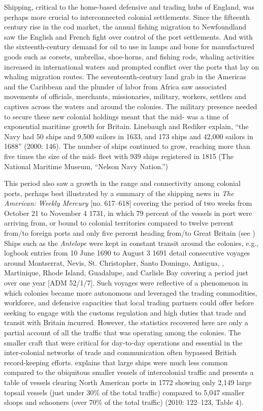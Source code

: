 Shipping, critical to the home-based defensive and trading hubs of England, was perhaps more crucial to interconnected colonial settlements. Since the fifteenth century rise in the cod market, the annual fishing migration to Newfoundland saw the English and French fight over control of the port settlements. And with the sixteenth-century demand for oil to use in lamps and bone for manufactured goods such as corsets, umbrellas, shoe-horns, and fishing rods, whaling activities increased in international waters and prompted conflict over the ports that lay on whaling migration routes. The seventeenth-century land grab in the Americas and the Caribbean and the plunder of labor from Africa saw associated movements of officials, merchants, missionaries, military, workers, settlers and captives across the waters and around the colonies. The military presence needed to secure these new colonial holdings meant that the mid- was a time of exponential maritime growth for Britain. Linebaugh and Rediker explain, “the Navy had 50 ships and 9,500 sailors in 1633, and 173 ships and 42,000 sailors in 1688” (2000: 146).  The number of ships continued to grow, reaching more than five times the size of the mid- fleet with 939 ships registered in 1815 (The National Maritime Museum, “Nelson Navy Nation.”) 

This period also saw a growth in the range and connectivity among colonial ports, perhaps best illustrated by a summary of the shipping news in \textit{The American: Weekly Mercury} [no. 617--618] covering the period of two weeks from October 21 to November 4 1731, in which 79 percent of the vessels in port were arriving from, or bound to colonial territories compared to twelve percent from/to foreign ports and only five percent heading from/to Great Britain (see ) Ships such as the \textit{Antelope} were kept in constant transit around the colonies, e.g., logbook entries from 10 June {1690} to August 3 1691 detail consecutive voyages around Montserrat, Nevis, St. Christopher, Santo Domingo, Antigua, , Martinique, Rhode Island, Guadalupe, and Carlisle Bay covering a period just over one year [ADM 52/1/7]. Such voyages were reflective of a phenomenon in which colonies became more autonomous and leveraged the trading commodities, workforce, and defensive capacities that local trading partners could offer before seeking to engage with the customs regulation and high duties that trade and transit with Britain incurred. However, the statistics recovered here are only a partial account of all the traffic that was operating among the colonies. The smaller craft that were critical for day-to-day operations and essential in the inter-colonial networks of trade and communication often bypassed British record-keeping efforts. \citeauthor{Jarvis2010} explains that large ships were much less common compared to the ubiquitous smaller vessels of intercolonial traffic and presents a table of vessels clearing North American ports in 1772 showing only 2,149 large topsail vessels (just under 30\% of the total traffic) compared to 5,047 smaller sloops and schooners (over 70\% of the total traffic) (2010: 122--123, Table 4). 

